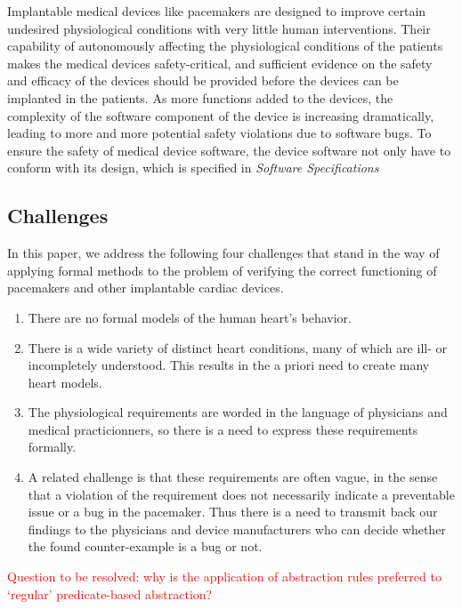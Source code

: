 Implantable medical devices like pacemakers are designed to improve certain undesired physiological conditions with very little human interventions. Their capability of autonomously affecting the physiological conditions of the patients makes the medical devices safety-critical, and sufficient evidence on the safety and efficacy of the devices should be provided before the devices can be implanted in the patients. As more functions added to the devices, the complexity of the software component of the device is increasing dramatically, leading to more and more potential safety violations due to software bugs. To ensure the safety of medical device software, the device software not only have to conform with its design, which is specified in \emph{Software Specifications}

\subsection{Challenges}
In this paper, we address the following four challenges that stand in the way of applying formal methods to the problem of verifying the correct functioning of pacemakers and other implantable cardiac devices.

\begin{enumerate}
	\item There are no formal models of the human heart's behavior.
	\item There is a wide variety of distinct heart conditions, many of which are ill- or incompletely understood.
	This results in the a priori need to create many heart models.
	\item The physiological requirements are worded in the language of physicians and medical practicionners, so there is a need to express these requirements formally.
	\item A related challenge is that these requirements are often vague, in the sense that a violation of the requirement does not necessarily indicate a preventable issue or a bug in the pacemaker. 
	Thus there is a need to transmit back our findings to the physicians and device manufacturers who can decide whether the found counter-example is a bug or not.
\end{enumerate}

\textcolor{red}{Question to be resolved: why is the application of abstraction rules preferred to `regular' predicate-based abstraction?
 }
